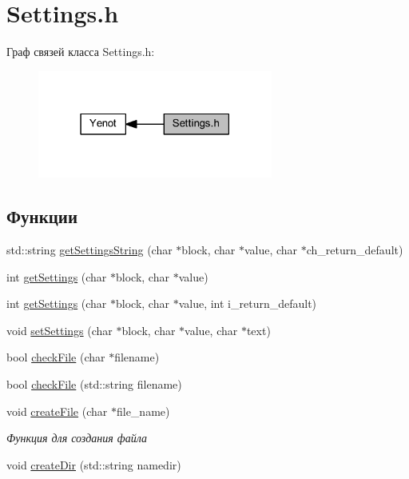 \hypertarget{group__settingsh}{}\section{Settings.\+h}
\label{group__settingsh}
Граф связей класса Settings.\+h\+:\nopagebreak
\begin{figure}[H]
\begin{center}
\leavevmode
\includegraphics[width=219pt]{group__settingsh}
\end{center}
\end{figure}
\subsection*{Функции}
\begin{DoxyCompactItemize}
\item 
std\+::string \mbox{\hyperlink{group__settingsh_ga3a0f1e87eb01bdd16c4a7e365aa283eb}{get\+Settings\+String}} (char $\ast$block, char $\ast$value, char $\ast$ch\+\_\+return\+\_\+default)
\item 
int \mbox{\hyperlink{group__settingsh_ga68b4d9ed6be7aaa93d9a6fe8fd683862}{get\+Settings}} (char $\ast$block, char $\ast$value)
\item 
int \mbox{\hyperlink{group__settingsh_ga0a2fe94de4037eda33c49fe332970891}{get\+Settings}} (char $\ast$block, char $\ast$value, int i\+\_\+return\+\_\+default)
\item 
void \mbox{\hyperlink{group__settingsh_ga463e32ccb37f9478b0e62ee0d21c5999}{set\+Settings}} (char $\ast$block, char $\ast$value, char $\ast$text)
\item 
bool \mbox{\hyperlink{group__settingsh_ga2dd1bc039652a0480c444957d416b6a6}{check\+File}} (char $\ast$filename)
\item 
bool \mbox{\hyperlink{group__settingsh_ga147bed619c6314e960320c1bcb40ed91}{check\+File}} (std\+::string filename)
\item 
void \mbox{\hyperlink{group__settingsh_ga8f34a2030acfb5567678ab2bba25f3c1}{create\+File}} (char $\ast$file\+\_\+name)
\begin{DoxyCompactList}\small\item\em Функция для создания файла \end{DoxyCompactList}\item 
void \mbox{\hyperlink{group__settingsh_ga912b67f6f6b05abadd055a379dd84864}{create\+Dir}} (std\+::string namedir)
\end{DoxyCompactItemize}


